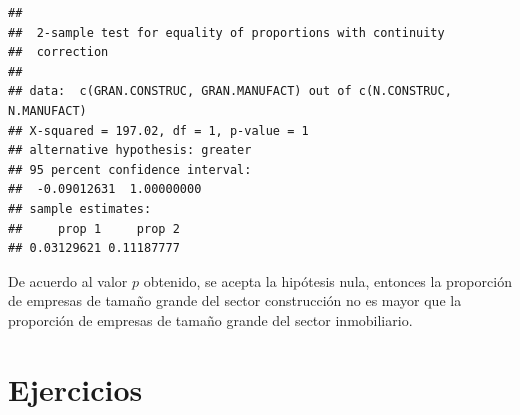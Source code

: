 \documentclass[letterpaper,]{book}
\begin{document}
\begin{verbatim}
## 
##  2-sample test for equality of proportions with continuity
##  correction
## 
## data:  c(GRAN.CONSTRUC, GRAN.MANUFACT) out of c(N.CONSTRUC, N.MANUFACT)
## X-squared = 197.02, df = 1, p-value = 1
## alternative hypothesis: greater
## 95 percent confidence interval:
##  -0.09012631  1.00000000
## sample estimates:
##     prop 1     prop 2 
## 0.03129621 0.11187777
\end{verbatim}

De acuerdo al valor \(p\) obtenido, se acepta la hipótesis nula, entonces la proporción de empresas de tamaño grande del sector construcción no es mayor que la proporción de empresas de tamaño grande del sector inmobiliario.

\newpage

\hypertarget{ejercicios-1}{%
\section{Ejercicios}\label{ejercicios-1}}
\end{document}

